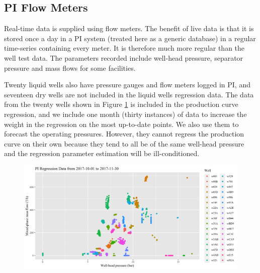 \documentclass[a4paper, 12pt]{article}
\begin{document}
\subsection{PI Flow Meters}
Real-time data is supplied using flow meters. The benefit of live data is that it is stored once a day in a PI system (treated here as a generic database) in a regular time-series containing every meter. It is therefore much more regular than the well test data. The parameters recorded include well-head pressure, separator pressure and mass flows for some facilities.


Twenty liquid wells also have pressure gauges and flow meters logged in PI, and seventeen dry wells are not included in the liquid wells regression data. The data from the twenty wells shown in Figure \ref{fig:pi_data} is included in the production curve regression, and we include one month (thirty instances) of data to increase the weight in the regression on the most up-to-date points. We also use them to forecast the operating pressures. However, they cannot regress the production curve on their own because they tend to all be of the same well-head pressure and the regression parameter estimation will be ill-conditioned.

\begin{figure}
  \centering
  \includegraphics[width=\linewidth]{media/pi_data}
  \label{fig:pi_data}
\end{figure}
\end{document}
